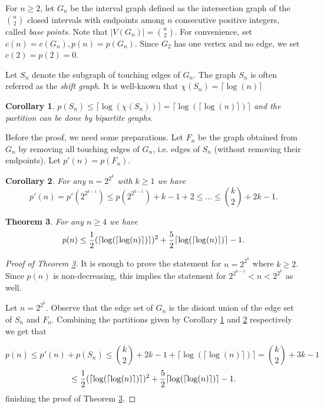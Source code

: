 \documentclass[12pt]{article}
\newtheorem{theorem}{Theorem}%
\newtheorem{corollary}[theorem]{Corollary}
\begin{document}
For $n\ge 2$, let $G_n$ be the interval graph defined as the intersection graph
of the $n\choose 2$ closed intervals with endpoints among $n$ consecutive positive integers,
called {\em base points}. Note that $|V(G_n)|={n\choose 2}$.
For convenience, set $c(n)=c(G_n),p(n)=p(G_n)$.
Since $G_2$ has one vertex and no edge, we set $c(2)=p(2)=0$.

Let $S_n$ denote the subgraph of touching edges of $G_n$.
The graph $S_n$ is often referred as the {\em shift graph}.
It is well-known that $\chi(S_n)=\lceil\log(n)\rceil$

\begin{corollary}\label{shift}
  $p(S_n)\le \lceil \log(\chi(S_n))\rceil = \lceil\log(\lceil\log(n)\rceil)\rceil$
  and the partition can be done by bipartite graphs.
\end{corollary}

Before the proof, we need some preparations.
Let $F_n$ be the graph obtained from $G_n$ by removing all touching edges of $G_n$,
i.e. edges of $S_n$ (without removing their endpoints).
Let
$p'(n)=p(F_n)$.

\begin{corollary}\label{p'}
  For any  $n= 2^{2^k}$ with $k\ge 1$ we have
  $$p'(n)=p'(2^{2^{k-1}})\le p(2^{2^{k-1}})+k-1+2 \le \dots \le {k\choose 2}+2k-1.$$
\end{corollary}

\begin{theorem}\label{ub} For any $n\ge 4$ we have
  $$p(n)\le {1\over 2}(\lceil\log(\lceil\log(n)\rceil)\rceil)^2+{5\over 2}\lceil\log(\lceil\log(n)\rceil)\rceil-1.$$
\end{theorem}

\begin{proof}[Proof of Theorem \ref{ub}]
It is enough to prove the statement for $n=2^{2^k}$ where $k\ge 2$.
Since $p(n)$ is non-decreasing, this implies the statement for $2^{2^{k-1}}<n < 2^{2^k}$ as well.

Let $n=2^{2^k}$. Observe that the edge set of $G_n$ is the disiont union of the edge set of $S_n$ and $F_n$.
Combining the partitions given by Corollary \ref{shift} and \ref{p'} respectively we get that

$$p(n) \le p'(n)+ p(S_n)\le {k\choose 2}+2k-1+ \lceil\log(\lceil\log(n)\rceil)\rceil={k\choose 2}+3k-1$$
$$\le {1\over 2}(\lceil\log(\lceil\log(n)\rceil)\rceil)^2+{5\over 2}\lceil\log(\lceil\log(n)\rceil)\rceil-1.$$
finishing the proof of Theorem \ref{ub}.
\end{proof}
\end{document}
